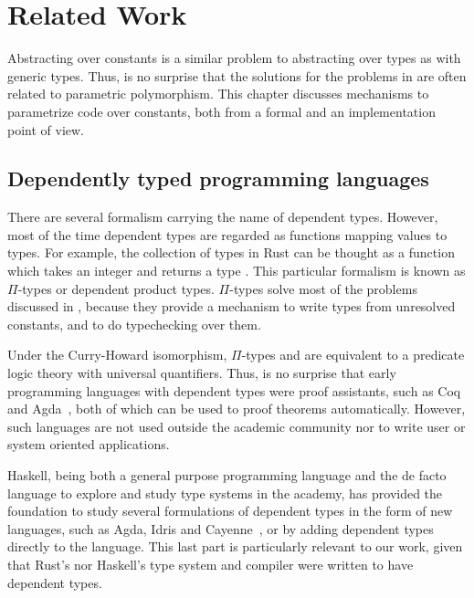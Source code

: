 \newcommand{\pdtn}[1] { \langle \text{#1} \rangle }

\chapter{Related Work}

\label{chap:related_work}

Abstracting over constants is a similar problem to abstracting over types as
with generic types. Thus, is no surprise that the solutions for the problems in
 are often related to parametric polymorphism. This
chapter discusses mechanisms to parametrize code over constants, both from a
formal and an implementation point of view.

\section{Dependently typed programming languages}

There are several formalism carrying the name of dependent types. However, most
of the time dependent types are regarded as functions mapping values to types.
For example, the collection of types \inrust{[N; i32]} in Rust can be thought
as a function which takes an integer  and returns a type \inrust{[N;
i32]}. This particular formalism is known as $\Pi$-types or dependent product
types. $\Pi$-types solve most of the problems discussed in
, because they provide a mechanism to write types from
unresolved constants, and to do typechecking over them.

Under the Curry-Howard isomorphism, $\Pi$-types and are equivalent to a
predicate logic theory with universal quantifiers. Thus, is no surprise that
early programming languages with dependent types were proof assistants, such as
Coq and Agda~\cite{agda}, both of which can be used to proof theorems
automatically.  However, such languages are not used outside the academic
community nor to write user or system oriented applications.

Haskell, being both a general purpose programming language and the de facto
language to explore and study type systems in the academy, has provided the
foundation to study several formulations of dependent types in the form of new
languages, such as Agda, Idris \cite{idris} and Cayenne~\cite{cayenne}, or by
adding dependent types directly to the language. This last part is particularly
relevant to our work, given that Rust's nor Haskell's type system and compiler
were written to have dependent types.

